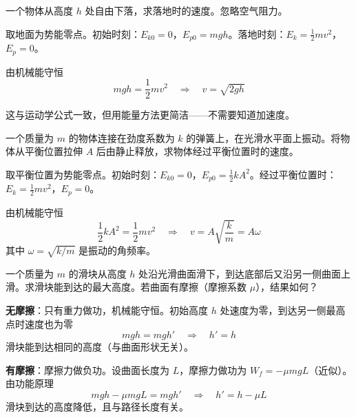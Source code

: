 \begin{example}
    一个物体从高度 $h$ 处自由下落，求落地时的速度。忽略空气阻力。
    \begin{solution}
        取地面为势能零点。初始时刻：$E_{k0} = 0$，$E_{p0} = mgh$。落地时刻：$E_k = \frac{1}{2}mv^2$，$E_p = 0$。
        
        由机械能守恒
        \begin{equation}
            mgh = \frac{1}{2}mv^2 \quad \Longrightarrow \quad v = \sqrt{2gh}
        \end{equation}
        
        这与运动学公式一致，但用能量方法更简洁——不需要知道加速度。
    \end{solution}
\end{example}

\begin{example}
    一个质量为 $m$ 的物体连接在劲度系数为 $k$ 的弹簧上，在光滑水平面上振动。将物体从平衡位置拉伸 $A$ 后由静止释放，求物体经过平衡位置时的速度。
    \begin{solution}
        取平衡位置为势能零点。初始时刻：$E_{k0} = 0$，$E_{p0} = \frac{1}{2}kA^2$。经过平衡位置时：$E_k = \frac{1}{2}mv^2$，$E_p = 0$。
        
        由机械能守恒
        \begin{equation}
            \frac{1}{2}kA^2 = \frac{1}{2}mv^2 \quad \Longrightarrow \quad v = A\sqrt{\frac{k}{m}} = A\omega
        \end{equation}
        其中 $\omega = \sqrt{k/m}$ 是振动的角频率。
    \end{solution}
\end{example}

\begin{example}
    一个质量为 $m$ 的滑块从高度 $h$ 处沿光滑曲面滑下，到达底部后又沿另一侧曲面上滑。求滑块能到达的最大高度。若曲面有摩擦（摩擦系数 $\mu$），结果如何？
    \begin{solution}
        \textbf{无摩擦}：只有重力做功，机械能守恒。初始高度 $h$ 处速度为零，到达另一侧最高点时速度也为零
        \begin{equation}
            mgh = mgh' \quad \Longrightarrow \quad h' = h
        \end{equation}
        滑块能到达相同的高度（与曲面形状无关）。
        
        \textbf{有摩擦}：摩擦力做负功。设曲面长度为 $L$，摩擦力做功为 $W_f = -\mu mgL$（近似）。由功能原理
        \begin{equation}
            mgh - \mu mgL = mgh' \quad \Longrightarrow \quad h' = h - \mu L
        \end{equation}
        滑块到达的高度降低，且与路径长度有关。
    \end{solution}
\end{example}

